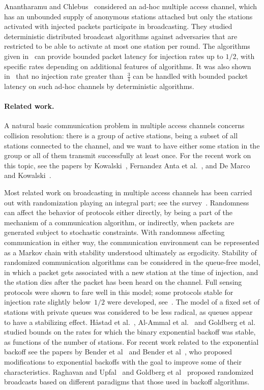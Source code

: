 \documentclass[11pt]{article}
\newcommand{\BBB}{\vspace*{-\bigskipamount}}
\newcommand{\Paragraph}[1]{\BBB\paragraph{#1}}
\begin{document}
Anantharamu and Chlebus~\cite{AnantharamuC15} considered an ad-hoc multiple access channel, which has an unbounded supply of anonymous stations attached but only the stations activated  with injected packets participate in broadcasting.
They studied deterministic distributed broadcast algorithms against adversaries that are restricted to be able to activate at most one station per round.
The algorithms given in~\cite{AnantharamuC15} can provide bounded packet latency for injection rates up to $1/2$, with specific rates depending on additional features of algorithms.
It was also shown in~\cite{AnantharamuC15} that no injection rate greater than~$\frac{3}{4}$ can be handled with bounded packet latency on such ad-hoc channels by deterministic algorithms.



\Paragraph{Related work.}

A natural basic communication problem in multiple access channels concerns collision resolution:  there is a group of active stations, being a subset of all stations connected to the channel, and we want to have either some station in the group or all of them transmit successfully at least once.
For the recent work on this topic, see the papers by Kowalski~\cite{Kowalski05}, Fernandez Anta et al.~\cite{FernandezMM-Algorithmica13}, and De Marco and Kowalski~\cite{DeMarcoK15}.

Most related work on broadcasting in multiple access channels has been carried out with  randomization playing an integral part; see the survey~\cite{Chlebus-randomized-radio-chapter-2001}.
Randomness can affect the behavior of protocols either directly, by being a part of the mechanism of a communication algorithm, or indirectly, when packets are generated subject to stochastic constraints.
With randomness affecting communication in either way, the communication environment can be represented as a Markov chain with stability understood ultimately as ergodicity.
Stability of randomized communication algorithms can be considered in  the queue-free model, in which a  packet gets associated with a new station at the time of injection, and the station dies after the packet has been heard on the channel.
Full sensing protocols were shown to fare well in this model; some protocols stable for injection rate slightly below~$1/2$ were developed, see~\cite{Chlebus-randomized-radio-chapter-2001}.
The model of a fixed set of stations with private queues was considered to be less radical, as queues appear to have a stabilizing effect.
H\aa stad et al.~\cite{HastadLR96}, Al-Ammal et al.~\cite{Al-AmmalGM01} and  Goldberg et al.~\cite{GoldbergJKP04} studied bounds on the rates for which the binary exponential backoff was stable, as functions of the number of stations.
For recent work related to the exponential backoff see the papers by  Bender et al~\cite{BenderFGY16} and Bender et al~\cite{BenderKPY16}, who proposed modifications to exponential backoffs with the goal to improve some of their characteristics. 
Raghavan and Upfal~\cite{RaghavanU98} and Goldberg et al~\cite{GoldbergMPS-JACM00} proposed randomized broadcasts based on different paradigms that those used in backoff algorithms. 
\end{document}
